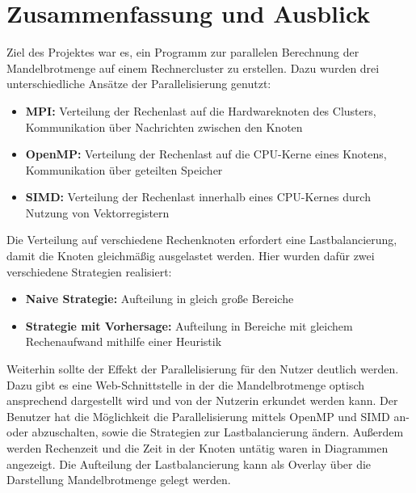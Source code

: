 \section{Zusammenfassung und Ausblick}


Ziel des Projektes war es, ein Programm zur parallelen Berechnung der Mandelbrotmenge auf einem Rechnercluster zu erstellen.
Dazu wurden drei unterschiedliche Ansätze der Parallelisierung genutzt:
\begin{itemize}
	\item \textbf{MPI:} Verteilung der Rechenlast auf die Hardwareknoten des Clusters, Kommunikation über Nachrichten zwischen den Knoten
	\item \textbf{OpenMP:} Verteilung der Rechenlast auf die CPU-Kerne eines Knotens, Kommunikation über geteilten Speicher
	\item \textbf{SIMD:} Verteilung der Rechenlast innerhalb eines CPU-Kernes durch Nutzung von Vektorregistern
\end{itemize}

Die Verteilung auf verschiedene Rechenknoten erfordert eine Lastbalancierung, damit die Knoten gleichmäßig ausgelastet werden.
Hier wurden dafür zwei verschiedene Strategien realisiert:
\begin{itemize}
	\item \textbf{Naive Strategie:} Aufteilung in gleich große Bereiche
	\item \textbf{Strategie mit Vorhersage:} Aufteilung in Bereiche mit gleichem Rechenaufwand mithilfe einer Heuristik
\end{itemize}

Weiterhin sollte der Effekt der Parallelisierung für den Nutzer deutlich werden.
Dazu gibt es eine Web-Schnittstelle in der die Mandelbrotmenge optisch ansprechend dargestellt wird und von der Nutzerin erkundet werden kann.
Der Benutzer hat die Möglichkeit die Parallelisierung mittels OpenMP und SIMD an- oder abzuschalten, sowie die Strategien zur Lastbalancierung ändern.
Außerdem werden Rechenzeit und die Zeit in der Knoten untätig waren in Diagrammen angezeigt.
Die Aufteilung der Lastbalancierung kann als Overlay über die Darstellung Mandelbrotmenge gelegt werden.


